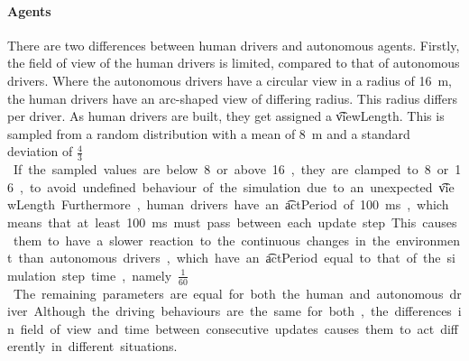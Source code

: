 

\paragraph{Agents}
There are two differences between human drivers and autonomous agents. Firstly, the field of view of the human drivers is limited, compared to that of autonomous drivers. Where the autonomous drivers have a circular view in a radius of \si{16 \meter}, the human drivers have an arc-shaped view of differing radius. This radius differs per driver. As human drivers are built, they get assigned a \t{viewLength}. This is sampled from a random distribution with a mean of \si{8 \meter} and a standard deviation of \si{$\frac{4}{3}$ \meter}. If the sampled values are below 8 or above 16, they are clamped to 8 or 16, to avoid undefined behaviour of the simulation due to an unexpected \t{viewLength}.

Furthermore, human drivers have an \t{actPeriod} of \si{100\milli\second}, which means that at least \si{100\milli\second} must pass between each update step. This causes them to have a slower reaction to the continuous changes in the environment than autonomous drivers, which have an \t{actPeriod} equal to that of the simulation step time, namely\si{$\frac{1}{60}$ \second}.

The remaining parameters are equal for both the human and autonomous driver. Although the driving behaviours are the same for both, the differences in field of view and time between consecutive updates causes them to act differently in different situations.



